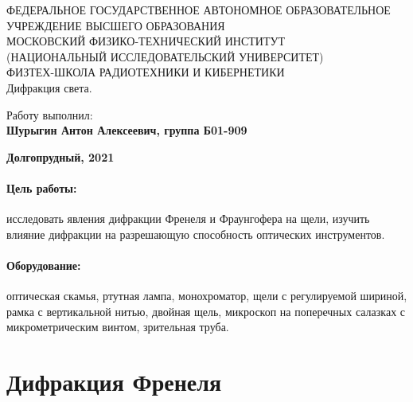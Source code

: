\documentclass[15pt,a5paper,reqno]{article}
\begin{document}
\begin{center}
  {\small ФЕДЕРАЛЬНОЕ ГОСУДАРСТВЕННОЕ АВТОНОМНОЕ ОБРАЗОВАТЕЛЬНОЕ\\ УЧРЕЖДЕНИЕ ВЫСШЕГО ОБРАЗОВАНИЯ\\ МОСКОВСКИЙ ФИЗИКО-ТЕХНИЧЕСКИЙ ИНСТИТУТ\\ (НАЦИОНАЛЬНЫЙ ИССЛЕДОВАТЕЛЬСКИЙ УНИВЕРСИТЕТ)\\ ФИЗТЕХ-ШКОЛА РАДИОТЕХНИКИ И КИБЕРНЕТИКИ}\\
  \hfill \break
  \hfill \break
  \hfill \break
  \Huge{Дифракция света.}\\
\end{center}

\hfill \break
\hfill \break
\hfill \break
\hfill \break
\hfill \break
\hfill \break

\begin{flushright}
  \normalsize{Работу выполнил:}\\
  \normalsize{\textbf{Шурыгин Антон Алексеевич, группа Б01-909}}\\
\end{flushright}

\begin{center}
  \normalsize{\textbf{Долгопрудный, 2021}}
\end{center}


\thispagestyle{empty} %


\newpage
\thispagestyle{plain}
\tableofcontents
\thispagestyle{plain}
\newpage


	\paragraph*{Цель работы:} исследовать явления дифракции Френеля и Фраунгофера на щели, изучить влияние дифракции на разрешающую способность оптических инструментов.
	
	\paragraph*{Оборудование:} оптическая скамья, ртутная лампа, монохроматор, щели с регулируемой шириной, рамка с вертикальной
нитью, двойная щель, микроскоп на поперечных салазках с микрометрическим винтом, зрительная труба.

	\section{Дифракция Френеля}
	
\end{document}
